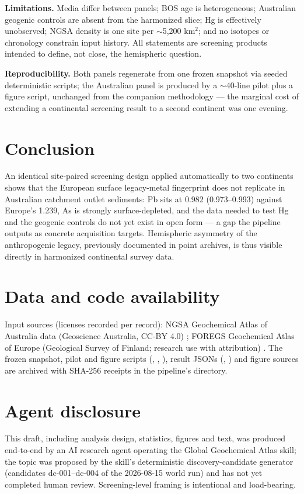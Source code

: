 \documentclass[11pt]{article}
\begin{document}
\textbf{Limitations.} Media differ between panels; BOS age is
heterogeneous; Australian geogenic controls are absent from the harmonized
slice; Hg is effectively unobserved; NGSA density is one site per
$\sim$5{,}200 km$^2$; and no isotopes or chronology constrain input history.
All statements are screening products intended to define, not close, the
hemispheric question.

\textbf{Reproducibility.} Both panels regenerate from one frozen snapshot
via seeded deterministic scripts; the Australian panel is produced by a
$\sim$40-line pilot plus a figure script, unchanged from the companion
methodology --- the marginal cost of extending a continental screening
result to a second continent was one evening.

\section{Conclusion}
An identical site-paired screening design applied automatically to two
continents shows that the European surface legacy-metal fingerprint does not
replicate in Australian catchment outlet sediments: Pb sits at 0.982
(0.973--0.993) against Europe's 1.239, As is strongly surface-depleted, and
the data needed to test Hg and the geogenic controls do not yet exist in
open form --- a gap the pipeline outputs as concrete acquisition targets.
Hemispheric asymmetry of the anthropogenic legacy, previously documented in
point archives, is thus visible directly in harmonized continental survey
data.

\section*{Data and code availability}
Input sources (licenses recorded per record): NGSA Geochemical Atlas of
Australia data (Geoscience Australia, CC-BY 4.0)
\cite{decaritat2011,decaritat2016}; FOREGS Geochemical Atlas of Europe
(Geological Survey of Finland; research use with attribution)
\cite{salminen2005,devos2006}. The frozen snapshot, pilot and figure scripts
(, ,
), result JSONs (,
) and figure sources are archived with
SHA-256 receipts in the pipeline's
 directory.

\section*{Agent disclosure}
This draft, including analysis design, statistics, figures and text, was
produced end-to-end by an AI research agent operating the Global Geochemical
Atlas skill; the topic was proposed by the skill's deterministic
discovery-candidate generator (candidates dc-001--dc-004 of the 2026-08-15
world run) and has not yet completed human review. Screening-level framing
is intentional and load-bearing.
\end{document}
